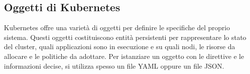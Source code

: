 \subsection{Oggetti di Kubernetes}
Kubernetes offre una varietà di oggetti per definire le specifiche del proprio sistema. Questi oggetti costituiscono entità persistenti per rappresentare lo stato del cluster, quali applicazioni sono in esecuzione e su quali nodi, le risorse da allocare e le politiche da adottare. Per istanziare un oggetto con le direttive e le informazioni decise, si utilizza spesso un file YAML oppure un file JSON.
